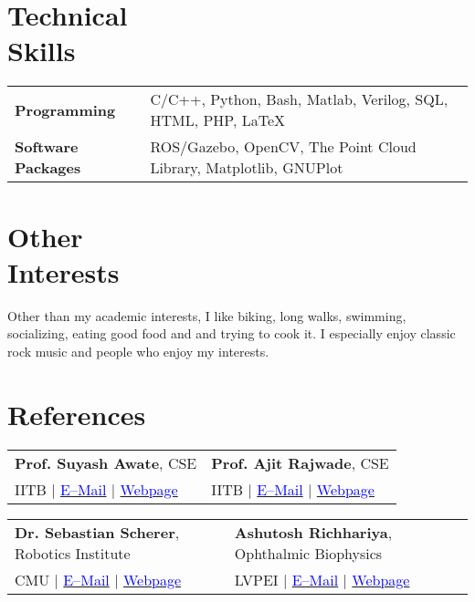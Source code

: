 \documentclass[margin,line]{res}
\begin{document}
\begin{resume}
\section{\sc Technical \\Skills} 
\begin{tabular}{@{}p{1.3in}p{4.3in}}
\textbf{Programming} & C/C++, Python, Bash, Matlab, Verilog, SQL, HTML, PHP, \LaTeX \\  
\vspace*{-0.06in}
\textbf{Software Packages} & 
\vspace*{-0.06in}
ROS/Gazebo, OpenCV, The Point Cloud Library, Matplotlib, GNUPlot \\ 
\end{tabular}
%
\section{\sc Other \\Interests}
Other than my academic interests, I like biking, long walks, swimming, socializing, eating good food and and trying to cook it. I especially enjoy classic rock music and people who enjoy my interests.

\section{\sc References}
\begin{tabular}{@{}p{3in}p{3in}}
\textbf{Prof. Suyash Awate}, CSE & \textbf{Prof. Ajit Rajwade}, CSE \\ 
IITB $|$ \href{mailto:suyash@cse.iitb.ac.in}{\textcolor{blue}{E--Mail}} $|$ \href{https://www.cse.iitb.ac.in/~suyash}{\textcolor{blue}{Webpage}} & IITB $|$ \href{mailto:ajitvr@cse.iitb.ac.in}{\textcolor{blue}{E--Mail}} $|$ \href{https://www.cse.iitb.ac.in/~ajitvr}{\textcolor{blue}{Webpage}} \\
\end{tabular}
\vspace{-0.15in}

\begin{tabular}{@{}p{3in}p{3in}}
\textbf{Dr. Sebastian Scherer}, Robotics Institute & \textbf{Ashutosh Richhariya}, Ophthalmic Biophysics \\ 
CMU $|$ \href{mailto:basti@andrew.cmu.edu}{\textcolor{blue}{E--Mail}} $|$ \href{http://www.ri.cmu.edu/person.html?person_id=1397}{\textcolor{blue}{Webpage}} & LVPEI $|$ \href{mailto:ashutosh@lvpei.org}{\textcolor{blue}{E--Mail}} $|$ \href{http://www.lvpei.org/our-team/our-team-ashutosh.php}{\textcolor{blue}{Webpage}} \\
\end{tabular}
\vspace{-0.15in}


\end{resume}
\end{document}
